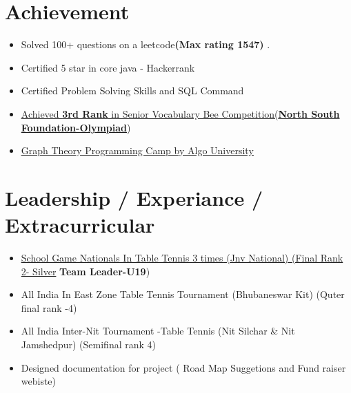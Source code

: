 \documentclass[letterpaper,11pt]{article}
\newcommand{\resumeItem}[1]{
  \item\small{
    {#1 \vspace{-2pt}}
  }
}
\newcommand{\resumeItemListStart}{\begin{itemize}}
\newcommand{\resumeItemListEnd}{\end{itemize}\vspace{-5pt}}
\begin{document}
\section{Achievement }
            \resumeItemListStart
                \resumeItem{Solved 100+ questions on a leetcode\textbf{(Max rating 1547)} .} \vspace{-7pt}
                \resumeItem{Certified 5 star in core java - Hackerrank} \vspace{-7pt}
                \resumeItem{Certified Problem Solving Skills and SQL Command } \vspace{-7pt}
                
                \resumeItem{\href{https://drive.google.com/file/d/1p0hVXhKxgF2aC2d0JEx9VR0ISjVyfFn3/view?usp=sharing}{\underline{Achieved \textbf{3rd Rank}} in Senior Vocabulary Bee Competition(\textbf{North South Foundation-Olympiad}})} \vspace{-7pt}
                \resumeItem{\href{https://drive.google.com/drive/my-drive}{\underline{Graph Theory Programming Camp by Algo University}} } \vspace{-7pt}
            \resumeItemListEnd
    \section{Leadership / Experiance / Extracurricular}
            \resumeItemListStart
                \resumeItem{\href{https://drive.google.com/file/d/1o8at1cRWf0QIv53wbohv7oHY9OkuSKgx/view?usp=sharing}{\underline{School Game Nationals In Table Tennis 3 times} (Jnv National) (Final Rank 2- Silver} \textbf{Team Leader-U19})} \vspace{-7pt}
                \resumeItem{ All India In East Zone Table Tennis Tournament (Bhubaneswar Kit) (Quter final rank -4)} \vspace{-7pt}
                \resumeItem{ All India Inter-Nit Tournament -Table Tennis (Nit Silchar \& Nit Jamshedpur) (Semifinal rank 4)} \vspace{-7pt}
               \resumeItem{ Designed documentation for project ( Road Map Suggetions and Fund raiser webiste)  } \vspace{-7pt}
            \resumeItemListEnd
\end{document}
